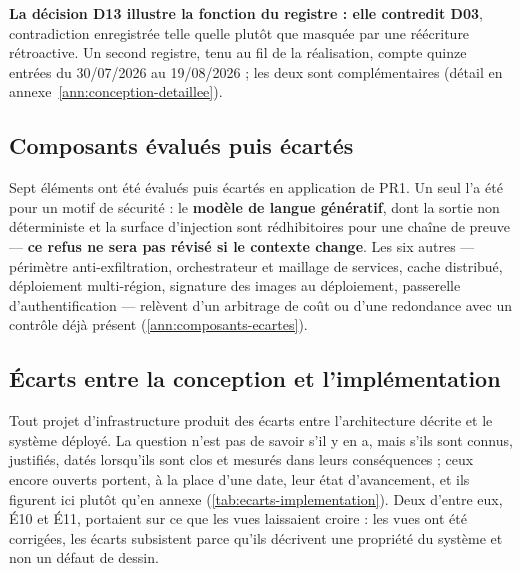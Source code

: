 \textbf{La décision D13 illustre la fonction du registre : elle contredit D03}, contradiction
enregistrée telle quelle plutôt que masquée par une réécriture rétroactive. Un second registre,
tenu au fil de la réalisation, compte quinze entrées du 30/07/2026 au 19/08/2026 ; les deux sont
complémentaires (détail en annexe~\ref{ann:conception-detaillee}).

\subsection{Composants évalués puis écartés}
\label{tab:composants-ecartes}

Sept éléments ont été évalués puis écartés en application de PR1. Un seul l'a été pour un motif de
sécurité : le \textbf{modèle de langue génératif}, dont la sortie non déterministe et la surface
d'injection sont rédhibitoires pour une chaîne de preuve --- \textbf{ce refus ne sera pas révisé si
le contexte change}. Les six autres --- périmètre anti-exfiltration, orchestrateur et maillage de
services, cache distribué, déploiement multi-région, signature des images au déploiement, passerelle
d'authentification --- relèvent d'un arbitrage de coût ou d'une redondance avec un contrôle déjà
présent (\cref{ann:composants-ecartes}).

\subsection{Écarts entre la conception et l'implémentation}

Tout projet d'infrastructure produit des écarts entre l'architecture décrite et le système déployé.
La question n'est pas de savoir s'il y en a, mais s'ils sont connus, justifiés, datés lorsqu'ils
sont clos et mesurés dans leurs conséquences ; ceux encore ouverts portent, à la place d'une date,
leur état d'avancement, et ils figurent ici plutôt qu'en annexe
(\cref{tab:ecarts-implementation}). Deux d'entre eux, É10 et É11, portaient sur ce que les
vues laissaient croire : les vues ont été corrigées, les écarts subsistent parce qu'ils décrivent
une propriété du système et non un défaut de dessin.

